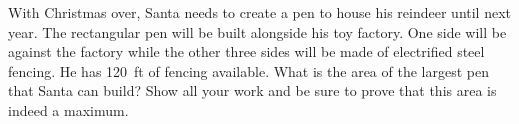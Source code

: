\documentclass[12pt,letterpaper]{exam}
\begin{document}
\begin{questions}
\newpage
{} \par\vspace{0.3cm}

With Christmas over, Santa needs to create a pen to house his reindeer until next year. The rectangular pen will be built alongside his toy factory. One side will be against the factory while the other three sides will be made of electrified steel fencing. He has 120~ft of fencing available. What is the area of the largest pen that Santa can build? Show all your work and be sure to prove that this area is indeed a maximum. \par\vspace{0.2cm}


\end{questions}
\end{document}
